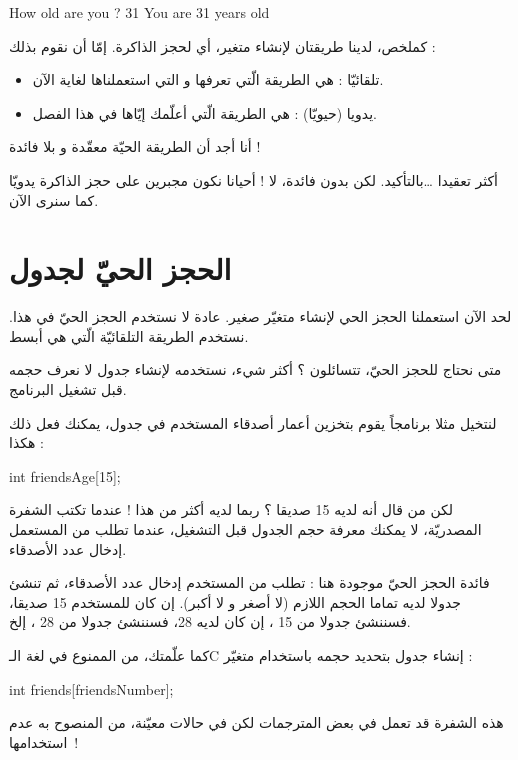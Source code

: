 \begin{Console}
How old are you ? 31
You are 31 years old
\end{Console}

كملخص، لدينا طريقتان لإنشاء متغير، أي لحجز الذاكرة. إمّا أن نقوم بذلك :
\begin{itemize}
  \item تلقائيّا : هي الطريقة الّتي تعرفها و التي استعملناها لغاية الآن.
  \item يدويا (حيويّا) : هي الطريقة الّتي أعلّمك إيّاها في هذا الفصل.
\end{itemize}

\begin{question}
أنا أجد أن الطريقة الحيّة معقّدة و بلا فائدة !
\end{question}

أكثر تعقيدا \dots بالتأكيد. لكن بدون فائدة، لا ! أحيانا نكون مجبرين على حجز الذاكرة يدويّا كما سنرى الآن.

\section{الحجز الحيّ لجدول}
لحد الآن استعملنا الحجز الحي لإنشاء متغيّر صغير. عادة لا نستخدم الحجز الحيّ في هذا. نستخدم الطريقة التلقائيّة الّتي هي أبسط.

متى نحتاج للحجز الحيّ، تتسائلون ؟ أكثر شيء، نستخدمه لإنشاء جدول لا نعرف حجمه قبل تشغيل البرنامج.

لنتخيل مثلا برنامجاً يقوم بتخزين أعمار أصدقاء المستخدم في جدول، يمكنك فعل ذلك هكذا :

\begin{Csource}
int friendsAge[15];
\end{Csource}

لكن من قال أنه لديه 15 صديقا ؟ ربما لديه أكثر من هذا !
عندما تكتب الشفرة المصدريّة، لا يمكنك معرفة حجم الجدول قبل التشغيل، عندما تطلب من المستعمل إدخال عدد الأصدقاء.

فائدة الحجز الحيّ موجودة هنا : تطلب من المستخدم إدخال عدد الأصدقاء، ثم تنشئ جدولا لديه تماما الحجم اللازم (لا أصغر و لا أكبر). إن كان للمستخدم 15 صديقا، فسننشئ جدولا من 15
،
إن كان لديه 28، فسننشئ جدولا من 28
،
إلخ.

كما علّمتك، من الممنوع في لغة الـ\textenglish{C}
إنشاء جدول بتحديد حجمه باستخدام متغيّر :

\begin{Csource}
int friends[friendsNumber];
\end{Csource}

\begin{information}
هذه الشفرة قد تعمل في بعض المترجمات لكن في حالات معيّنة، من المنصوح به عدم استخدامها~!
\end{information}


